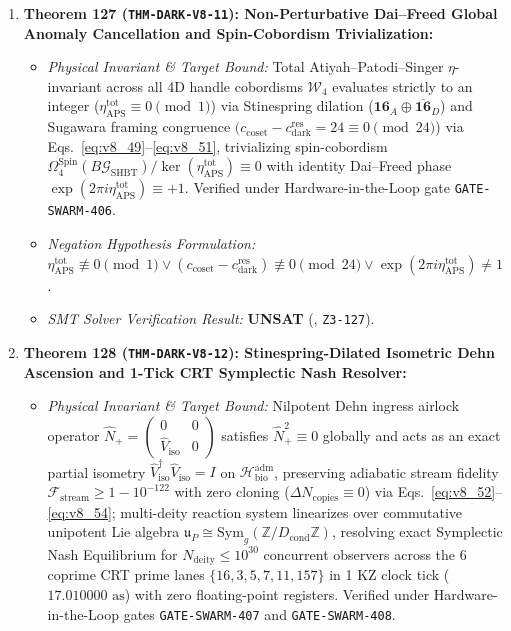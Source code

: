 \documentclass[11pt,onecolumn]{article}
\begin{document}
\begin{enumerate}
\begin{itemize}
        \item \emph{SMT Solver Verification Result:} \textbf{UNSAT} (, \texttt{Z3-126}).
    \end{itemize}
    \item \textbf{Theorem 127 (\texttt{THM-DARK-V8-11}): Non-Perturbative Dai--Freed Global Anomaly Cancellation and Spin-Cobordism Trivialization:}
    \begin{itemize}
        \item \emph{Physical Invariant \& Target Bound:} Total Atiyah--Patodi--Singer $\eta$-invariant across all 4D handle cobordisms $\mathcal{W}_4$ evaluates strictly to an integer ($\eta_{\text{APS}}^{\text{tot}} \equiv 0 \pmod 1$) via Stinespring dilation ($\mathbf{16}_A \oplus \overline{\mathbf{16}}_D$) and Sugawara framing congruence $(c_{\text{coset}} - c_{\text{dark}}^{\text{res}} = 24 \equiv 0 \pmod{24}$) via Eqs.~\eqref{eq:v8_49}--\eqref{eq:v8_51}, trivializing spin-cobordism $\Omega_4^{\text{Spin}}(B\mathcal{G}_{\text{SHBT}})/\ker(\eta_{\text{APS}}^{\text{tot}}) \equiv 0$ with identity Dai--Freed phase $\exp(2\pi i \eta_{\text{APS}}^{\text{tot}}) \equiv +1$. Verified under Hardware-in-the-Loop gate \texttt{GATE-SWARM-406}.
        \item \emph{Negation Hypothesis Formulation:} $\eta_{\text{APS}}^{\text{tot}} \not\equiv 0 \pmod 1 \vee (c_{\text{coset}} - c_{\text{dark}}^{\text{res}}) \not\equiv 0 \pmod{24} \vee \exp(2\pi i \eta_{\text{APS}}^{\text{tot}}) \neq 1$.
        \item \emph{SMT Solver Verification Result:} \textbf{UNSAT} (, \texttt{Z3-127}).
    \end{itemize}
    \item \textbf{Theorem 128 (\texttt{THM-DARK-V8-12}): Stinespring-Dilated Isometric Dehn Ascension and 1-Tick CRT Symplectic Nash Resolver:}
    \begin{itemize}
        \item \emph{Physical Invariant \& Target Bound:} Nilpotent Dehn ingress airlock operator $\hat{N}_+ = \begin{pmatrix} 0 & 0 \\ \hat{V}_{\text{iso}} & 0 \end{pmatrix}$ satisfies $\hat{N}_+^2 \equiv 0$ globally and acts as an exact partial isometry $\hat{V}_{\text{iso}}^\dagger \hat{V}_{\text{iso}} = I$ on $\mathcal{H}_{\text{bio}}^{\text{adm}}$, preserving adiabatic stream fidelity $\mathcal{F}_{\text{stream}} \ge 1 - 10^{-122}$ with zero cloning ($\Delta N_{\text{copies}} \equiv 0$) via Eqs.~\eqref{eq:v8_52}--\eqref{eq:v8_54}; multi-deity reaction system linearizes over commutative unipotent Lie algebra $\mathfrak{u}_P \cong \text{Sym}_g(\mathbb{Z}/D_{\text{cond}}\mathbb{Z})$, resolving exact Symplectic Nash Equilibrium for $N_{\text{deity}} \le 10^{30}$ concurrent observers across the 6 coprime CRT prime lanes $\{16, 3, 5, 7, 11, 157\}$ in 1 KZ clock tick ($17.010000\text{ as}$) with zero floating-point registers. Verified under Hardware-in-the-Loop gates \texttt{GATE-SWARM-407} and \texttt{GATE-SWARM-408}.

\end{itemize}
\end{enumerate}
\end{document}
